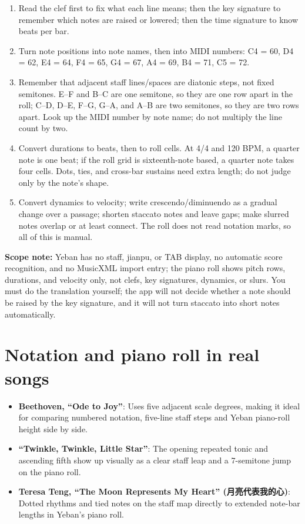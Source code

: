 \begin{enumerate}
  \item Read the clef first to fix what each line means; then the key signature to remember which notes are raised or lowered; then the time signature to know beats per bar.
  \item Turn note positions into note names, then into MIDI numbers: C4 = 60, D4 = 62, E4 = 64, F4 = 65, G4 = 67, A4 = 69, B4 = 71, C5 = 72.
  \item Remember that adjacent staff lines/spaces are diatonic steps, not fixed semitones. E--F and B--C are one semitone, so they are one row apart in the roll; C--D, D--E, F--G, G--A, and A--B are two semitones, so they are two rows apart. Look up the MIDI number by note name; do not multiply the line count by two.
  \item Convert durations to beats, then to roll cells. At 4/4 and 120 BPM, a quarter note is one beat; if the roll grid is sixteenth-note based, a quarter note takes four cells. Dots, ties, and cross-bar sustains need extra length; do not judge only by the note's shape.
  \item Convert dynamics to velocity; write crescendo/diminuendo as a gradual change over a passage; shorten staccato notes and leave gaps; make slurred notes overlap or at least connect. The roll does not read notation marks, so all of this is manual.
\end{enumerate}


\textbf{Scope note:} Yeban has no staff, jianpu, or TAB display, no automatic score recognition, and no MusicXML import entry; the piano roll shows pitch rows, durations, and velocity only, not clefs, key signatures, dynamics, or slurs. You must do the translation yourself; the app will not decide whether a note should be raised by the key signature, and it will not turn staccato into short notes automatically.

\section{Notation and piano roll in real songs}

\begin{itemize}
  \item \textbf{Beethoven, ``Ode to Joy''}: Uses five adjacent scale degrees, making it ideal for comparing numbered notation, five-line staff steps and Yeban piano-roll height side by side.
  \item \textbf{``Twinkle, Twinkle, Little Star''}: The opening repeated tonic and ascending fifth show up visually as a clear staff leap and a 7-semitone jump on the piano roll.
  \item \textbf{Teresa Teng, ``The Moon Represents My Heart'' (月亮代表我的心)}: Dotted rhythms and tied notes on the staff map directly to extended note-bar lengths in Yeban's piano roll.
\end{itemize}

